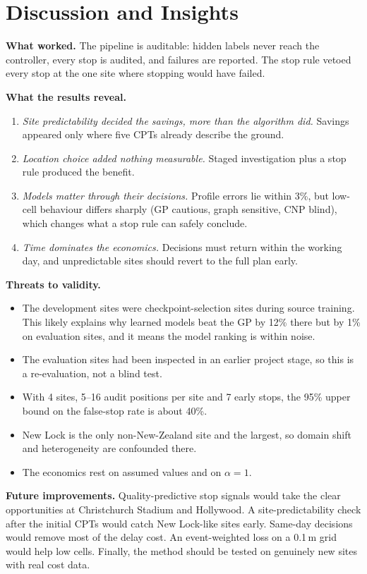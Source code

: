 \section{Discussion and Insights}

\textbf{What worked.} The pipeline is auditable: hidden labels never reach the controller, every stop is
audited, and failures are reported. The stop rule vetoed every stop at the one site where stopping would
have failed.

\textbf{What the results reveal.}
\begin{enumerate}
\item \emph{Site predictability decided the savings, more than the algorithm did.} Savings appeared only
  where five CPTs already describe the ground.
\item \emph{Location choice added nothing measurable.} Staged investigation plus a stop rule produced the
  benefit.
\item \emph{Models matter through their decisions.} Profile errors lie within 3\%, but low-cell behaviour
  differs sharply (GP cautious, graph sensitive, CNP blind), which changes what a stop rule can safely
  conclude.
\item \emph{Time dominates the economics.} Decisions must return within the working day, and unpredictable
  sites should revert to the full plan early.
\end{enumerate}

\textbf{Threats to validity.}
\begin{itemize}
\item The development sites were checkpoint-selection sites during source training. This likely explains
  why learned models beat the GP by 12\% there but by 1\% on evaluation sites, and it means the model
  ranking is within noise.
\item The evaluation sites had been inspected in an earlier project stage, so this is a re-evaluation, not a
  blind test.
\item With 4 sites, 5--16 audit positions per site and 7 early stops, the 95\% upper bound on the
  false-stop rate is about 40\%.
\item New Lock is the only non-New-Zealand site and the largest, so domain shift and heterogeneity are
  confounded there.
\item The economics rest on assumed values and on $\alpha=1$.
\end{itemize}

\textbf{Future improvements.} Quality-predictive stop signals would take the clear opportunities at
Christchurch Stadium and Hollywood. A site-predictability check after the initial CPTs would catch New
Lock-like sites early. Same-day decisions would remove most of the delay cost. An event-weighted loss on a
0.1\,m grid would help low cells. Finally, the method should be tested on genuinely new sites with real
cost data.

